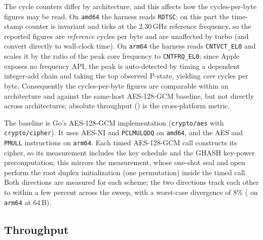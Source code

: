 The cycle counters differ by architecture, and this affects how the
cycles-per-byte figures may be read. On \texttt{amd64} the harness reads
\texttt{RDTSC}; on this part the time-stamp counter is invariant and ticks at the
$2.30$\,GHz reference frequency, so the reported figures are \emph{reference}
cycles per byte and are unaffected by turbo (and convert directly to wall-clock
time). On \texttt{arm64} the harness reads \texttt{CNTVCT\_EL0} and scales it by
the ratio of the peak core frequency to \texttt{CNTFRQ\_EL0}; since Apple exposes
no frequency API, the peak is auto-detected by timing a dependent integer-add
chain and taking the top observed P-state, yielding \emph{core} cycles per byte.
Consequently the cycles-per-byte figures are comparable within an architecture
and against the same-host AES-128-GCM baseline, but not directly across
architectures; absolute throughput () is the cross-platform
metric.

The baseline is Go's AES-128-GCM implementation
(\texttt{crypto/\allowbreak aes} with \texttt{crypto/\allowbreak cipher}).
It uses AES-NI and \texttt{PCLMULQDQ} on \texttt{amd64}, and the AES
and \texttt{PMULL} instructions on \texttt{arm64}.
Each timed AES-128-GCM call constructs its cipher, so its measurement includes
the key schedule and the GHASH key-power precomputation; this mirrors the
\TW{} measurement, whose one-shot seal and open perform the root duplex
initialization (one permutation) inside the timed call. Both directions are
measured for each scheme; the two directions track each other to within a few
percent across the sweep, with a worst-case divergence of $8\%$ (\TW{} on
\texttt{arm64} at $64$\,B).

\subsection{Throughput}
\label{sec:throughput}

